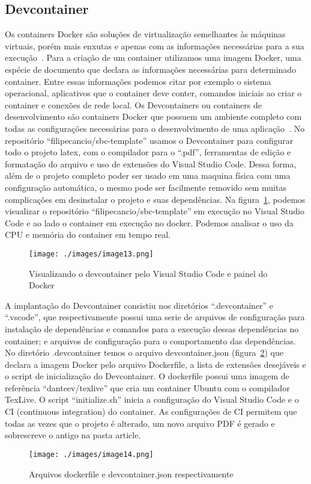 

\subsection{Devcontainer}
Os containers Docker são soluções de virtualização semelhantes às máquinas virtuais, porém mais enxutas e apenas com as informações necessárias para a sua execução~\cite{vitalino:01}. Para a criação de um container utilizamos uma imagem Docker, uma espécie de documento que declara as informações necessárias para determinado container. Entre essas informações podemos citar por exemplo o sistema operacional, aplicativos que o container deve conter, comandos iniciais ao criar o container e conexões de rede local.
Os Devcontainers ou containers de desenvolvimento são containers Docker que possuem um ambiente completo com todas as configurações necessárias para o desenvolvimento de uma aplicação~\cite{github:01}. No repositório ``filipecancio/sbc-template'' usamos o Devcontainer para configurar todo o projeto latex, com o compilador para o ``.pdf'', ferramentas de edição e formatação do arquivo e uso de extensões do Visual Studio Code. Dessa forma, além de o projeto completo poder ser usado em uma maquina física com uma configuração automática, o mesmo pode ser facilmente removido sem muitas complicações em desinstalar o projeto e suas dependências.
Na figura~\ref{fig:image13}, podemos visualizar o repositório ``filipecancio/sbc-template'' em execução no Visual Studio Code e ao lado o container em execução no docker. Podemos analisar o uso da CPU e memória do container em tempo real.

\begin{figure}[ht]
	\centering
	\texttt{[image: ./images/image13.png]}
	\caption{Visualizando o devcontainer pelo Visual Studio Code e painel do Docker}
	\label{fig:image13}
\end{figure}

A implantação do Devcontainer consistiu nos diretórios ``.devcontainer'' e ``.vscode'', que respectivamente possui uma serie de arquivos de configuração para instalação de dependências e comandos para a execução dessas dependências no container; e arquivos de configuração para o comportamento das dependências.
No diretório .devcontainer temos o arquivo devcontainer.json (figura~\ref{fig:image14}) que declara a imagem Docker pelo arquivo Dockerfile, a lista de extensões desejáveis e o script de inicialização do Devcontainer. O dockerfile possui uma imagem de referência ``danteev/texlive'' que cria um container Ubuntu com o compilador TexLive. O script ``initialize.sh'' inicia a configuração do Visual Studio Code e o CI (continuous integration) do container. As configurações de CI permitem que todas as vezes que o projeto é alterado, um novo arquivo PDF é gerado e sobrescreve o antigo na pasta article.

\begin{figure}[ht]
	\centering
	\texttt{[image: ./images/image14.png]}
	\caption{Arquivos dockerfile e devcontainer.json respectivamente}
	\label{fig:image14}
\end{figure}


